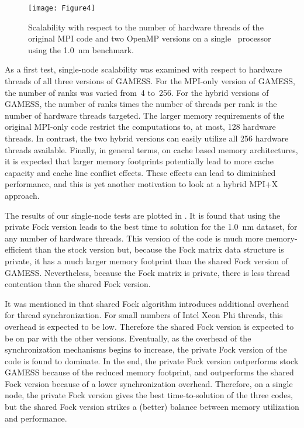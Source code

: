 \begin{figure}
	\texttt{[image: Figure4]}
	\caption{Scalability with respect to the number of hardware threads of the original MPI code
    		and two OpenMP versions on a single \intelphireg\ processor using the 1.0~nm benchmark.}
    \label{fig:singlescaling}
\end{figure}

As a first test, single-node scalability was examined with respect to hardware threads of all three versions of GAMESS. For the MPI-only version of GAMESS, the number of ranks was varied from~4 to~256. For the hybrid versions of GAMESS, the number of ranks times the number of threads per rank is the number of hardware threads targeted. The larger memory requirements of the original MPI-only code restrict the computations to, at most, 128 hardware threads. In contrast, the two hybrid versions can easily utilize all 256 hardware threads available. Finally, in general terms, on cache based memory architectures, it is expected that larger memory footprints potentially lead to more cache capacity and cache line conflict effects. These effects can lead to diminished performance, and this is yet another motivation to look at a hybrid MPI+X approach.

The results of our single-node tests are plotted in . It is found that using the private Fock version leads to the best time to solution for the 1.0~nm dataset, for any number of hardware threads. This version of the code is much more memory-efficient than the stock version but, because the Fock matrix data structure is private, it has a much larger memory footprint than the shared Fock version of GAMESS. Nevertheless, because the Fock matrix is private, there is less thread contention than the shared Fock version.

It was mentioned in  that shared Fock algorithm introduces additional overhead for thread synchronization. For small numbers of Intel Xeon Phi threads, this overhead is expected to be low. Therefore the shared Fock version is expected to be on par with the other versions. Eventually, as the overhead of the synchronization mechanisms begins to increase, the private Fock version of the code is found to dominate. In the end, the private Fock version outperforms stock GAMESS because of the reduced memory footprint, and outperforms the shared Fock version because of a lower synchronization overhead.
Therefore, on a single node, the private Fock version gives the best time-to-solution of the three codes, but the shared Fock version strikes a (better) balance between memory utilization and performance.

